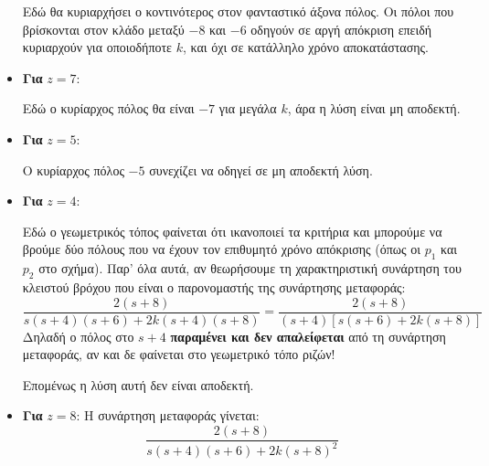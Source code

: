 \documentclass[11pt,a4paper,notitlepage,fleqn]{article}
\begin{document}
\begin{exercise}
\begin{enumgreekparen}
\begin{itemize}
    	Εδώ θα κυριαρχήσει ο κοντινότερος στον φανταστικό άξονα πόλος. Οι πόλοι που
    	βρίσκονται στον κλάδο μεταξύ \( -8 \) και \( -6 \) οδηγούν σε αργή απόκριση επειδή
    	κυριαρχούν για οποιοδήποτε \( k \), και όχι σε κατάλληλο χρόνο αποκατάστασης.
    	\item \textbf{Για} \( z=7 \): 
    	
    	Εδώ ο κυρίαρχος πόλος θα είναι \(-7\) για μεγάλα \( k \), άρα η λύση είναι μη
    	αποδεκτή.
    	
    	\item \textbf{Για} \( z=5 \): 
    	
    	Ο κυρίαρχος πόλος \( -5 \) συνεχίζει να οδηγεί σε μη αποδεκτή λύση.
    	
    	\item \textbf{Για} \( z=4 \): 
    	
    	Εδώ ο γεωμετρικός τόπος φαίνεται ότι ικανοποιεί τα κριτήρια και μπορούμε να βρούμε
    	δύο πόλους που να έχουν τον επιθυμητό χρόνο απόκρισης (όπως οι \( p_1 \) και
    	\( p_2 \) στο σχήμα).
    	Παρ' όλα αυτά, αν θεωρήσουμε τη χαρακτηριστική συνάρτηση του κλειστού βρόχου που
    	είναι ο παρονομαστής της συνάρτησης μεταφοράς:
    	\[
    	\frac{2(s+8)}{s(s+4)(s+6)+2k(s+4)(s+8)}
    	= \frac{2(s+8)}{(s+4)\left[
    	s(s+6)+2k(s+8)
    	\right]}
    	\]
    	Δηλαδή ο πόλος στο \( s+4 \) \textbf{παραμένει και δεν απαλείφεται} από τη συνάρτηση
    	μεταφοράς, αν και δε φαίνεται στο γεωμετρικό τόπο ριζών!
    	
    	Επομένως η λύση αυτή δεν είναι αποδεκτή.
    	
    	\item \textbf{Για} \( z=8 \): Η συνάρτηση μεταφοράς γίνεται:
    	\[
    	\frac{2(s+8)}{s(s+4)(s+6)+2k(s+8)^2}
    	\]
    	
    \end{itemize}
\end{enumgreekparen}

\end{exercise}
\end{document}
